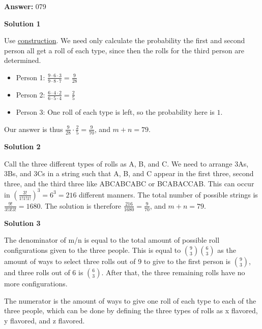 \begin{enumerate}
 \textbf{Answer: }079



\textbf{Solution 1}

Use \href{https://artofproblemsolving.com/wiki/index.php?title=Construction}{construction}. We need only calculate the probability the first and second person all get a roll of each type, since then the rolls for the third person are determined. 

 
            \begin{itemize}
        \item Person 1: $\frac{9 \cdot 6 \cdot 3}{9 \cdot 8 \cdot 7} = \frac{9}{28}$
            \end{itemize}
            
            \begin{itemize}
        \item Person 2: $\frac{6 \cdot 4 \cdot 2}{6 \cdot 5 \cdot 4} = \frac 25$
        \item Person 3: One roll of each type is left, so the probability here is $1$.
            \end{itemize}
            Our answer is thus $\frac{9}{28} \cdot \frac{2}{5} = \frac{9}{70}$, and $m + n = \boxed{79}$.

 



\textbf{Solution 2}

Call the three different types of rolls as A, B, and C. We need to arrange 3As, 3Bs, and 3Cs in a string such that A, B, and C appear in the first three, second three, and the third three like ABCABCABC or BCABACCAB. This can occur in $\left(\frac{3!}{1!1!1!}\right)^3 = 6^3 = 216$ different manners. The total number of possible strings is $\frac{9!}{3!3!3!} = 1680$. The solution is therefore $\frac{216}{1680} = \frac{9}{70}$, and $m + n = \boxed{79}$.

 



\textbf{Solution 3}

The denominator of m/n is equal to the total amount of possible roll configurations given to the three people. This is equal to ${9 \choose 3}{6 \choose3}$ as the amount of ways to select three rolls out of 9 to give to the first person is ${9 \choose 3}$, and three rolls out of 6 is ${6 \choose3}$. After that, the three remaining rolls have no more configurations. 

 The numerator is the amount of ways to give one roll of each type to each of the three people, which can be done by defining the three types of rolls as x flavored, y flavored, and z flavored. 


\end{enumerate}

